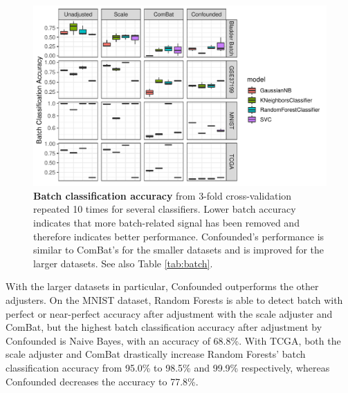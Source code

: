 \documentclass[11pt]{article}
\begin{document}
\begin{figure}
	\centering
	\includegraphics[width=\columnwidth]{figures/final/batch_accuracy.pdf}
	\caption[Batch classification accuracy]{\textbf{Batch classification accuracy} from 3-fold cross-validation repeated 10 times for several classifiers.
	Lower batch accuracy indicates that more batch-related signal has been removed and therefore indicates better performance.
	Confounded's performance is similar to ComBat's for the smaller datasets and is improved for the larger datasets.
	See also Table \ref{tab:batch}.}
	\label{fig:batch}
\end{figure}
\begin{table}
	\centering
	
	\caption[Batch classification accuracy]{
		\textbf{Batch classification accuracy} for several datasets and adjusters.
		The ideal batch adjuster would completely remove all signal due to batch and would therefore \textit{decrease} batch classification accuracy to around the baseline for all classifiers.
		See also \figurename{} \ref{fig:batch}.
	}
	\label{tab:batch}
\end{table}

With the larger datasets in particular, Confounded outperforms the other adjusters.
On the MNIST dataset, Random Forests is able to detect batch with perfect or near-perfect accuracy after adjustment with the scale adjuster and ComBat, but the highest batch classification accuracy after adjustment by Confounded is Naive Bayes, with an accuracy of 68.8\%.
With TCGA, both the scale adjuster and ComBat drastically increase Random Forests' batch classification accuracy from 95.0\% to 98.5\% and 99.9\% respectively, whereas Confounded decreases the accuracy to 77.8\%.
\end{document}
